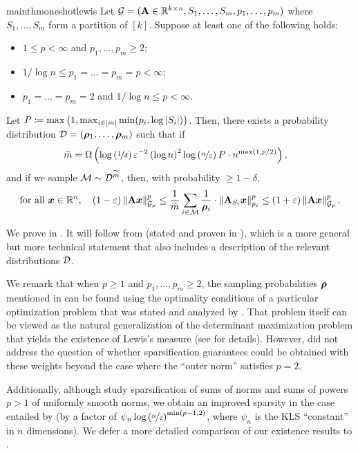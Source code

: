 \documentclass[11pt]{article}
\numberwithin{equation}{section}
\begin{document}
\begin{restatable}{mainthm}{oneshotlewis}
\label{thm:one_shot_lewis}
Let $\mathcal{G} = (\mathbf{A} \in \mathbb{R}^{k \times n}, S_1,\dots,S_m, p_1,\dots,p_m)$ where $S_1,\dots,S_m$ form a partition of $[k]$. Suppose at least one of the following holds:
\begin{itemize}
    \item $1 \le p < \infty$ and $p_1,\dots,p_m \ge 2$;
    \item $1/\log n \le p_1 = \dots = p_m = p < \infty$;
    \item $p_1 = \dots = p_m = 2$ and $1/\log n \le p < \infty$.
\end{itemize}
Let $P \coloneqq \max\left(1, \max_{i \in [m]} \min(p_i,\log\left\lvert S_i \right\rvert)\right)$. Then, there exists a probability distribution $\mathcal{D} = \left(\bm{\rho}_1,\dots,\bm{\rho}_m\right)$ such that if
\begin{align*}
    \widetilde{m} &= \Omega\left(\log\left(\nicefrac{1}{\delta}\right)\varepsilon^{-2}\left(\log n\right)^2\log\left(\nicefrac{n}{\varepsilon}\right) P \cdot  n^{\max(1,p/2)}\right),
\end{align*}
and if we sample $\mathcal{M} \sim \mathcal{D}^{\widetilde{m}}$, then, with probability $\ge 1-\delta$,
\begin{align*}
    \text{for all } \bm{x} \in \mathbb{R}^n,\quad (1-\varepsilon)\left\lVert \mathbf{A}\bm{x} \right\rVert_{\mathcal{G}_{p}}^p \le \frac{1}{\widetilde{m}}\sum_{i \in \mathcal{M}} \frac{1}{\bm{\rho}_i} \cdot \left\lVert \mathbf{A}_{S_i}\bm{x} \right\rVert_{p_i}^p \le (1+\varepsilon)\left\lVert \mathbf{A}\bm{x} \right\rVert_{\mathcal{G}_{p}}^p.
\end{align*}
\end{restatable}

We prove  in . It will follow from  (stated and proven in ), which is a more general but more technical statement that also includes a description of the relevant distributions $\mathcal{D}$.

We remark that when $p \ge 1$ and $p_1,\dots,p_m \ge 2$, the sampling probabilities \(\bm{\rho}\) mentioned in  can be found using the optimality conditions of a particular optimization problem that was stated and analyzed by \citet[Section 4]{jlls23}. That problem itself can be viewed as the natural generalization of the determinant maximization problem that yields the existence of Lewis's measure (see \cite[Section 2]{sz01} for details). However, \cite{jlls23} did not address the question of whether sparsification guarantees could be obtained with these weights beyond the case where the ``outer norm'' satisfies $p=2$.

Additionally, although \cite{jlls23} study sparsification of sums of norms and sums of powers $p > 1$ of uniformly smooth norms, we obtain an improved sparsity in the case entailed by  (by a factor of $\psi_n\log\left(\nicefrac{n}{\varepsilon}\right)^{\min(p-1,2)}$, where $\psi_n$ is the KLS ``constant'' in $n$ dimensions). We defer a more detailed comparison of our existence results to .
\end{document}
